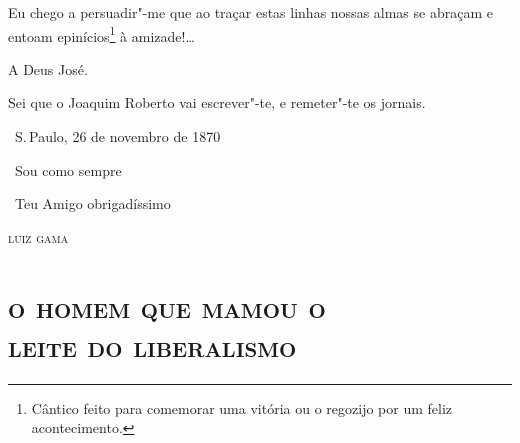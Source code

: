 Eu chego a persuadir"-me que ao traçar estas linhas nossas almas se
abraçam e entoam epinícios\footnote{Cântico feito para comemorar uma
  vitória ou o regozijo por um feliz acontecimento.}
à amizade!\ldots{}

A Deus José.

Sei que o Joaquim Roberto vai escrever"-te, e remeter"-te os jornais.

\bigskip

\hfill\ S.\,Paulo, 26 de novembro de 1870\medskip

\hfill\ Sou como sempre

\hfill\ Teu Amigo obrigadíssimo

\hfill\textsc{luiz gama}

\pagebreak
\thispagestyle{empty}
\movetooddpage
\thispagestyle{empty}
\begingroup\makeatletter\@openrightfalse
\part[O homem que mamou o leite do liberalismo]{\textsc{o homem que mamou o\\ leite do liberalismo}}

\mbox{}\vfill
\thispagestyle{empty}


